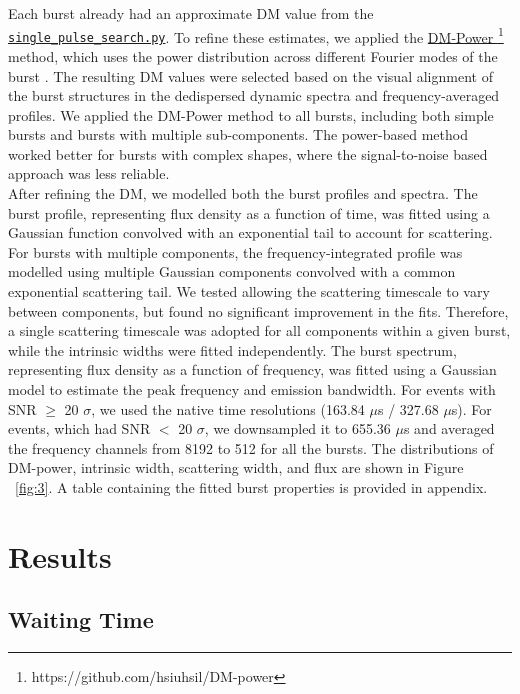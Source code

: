\documentclass[preprint2, trackchanges]{aastex631}
\begin{document}
Each burst already had an approximate DM value from the  \href{https://github.com/scottransom/presto/blob/master/bin/single_pulse_search.py}{\texttt{single\_pulse\_search.py}}. To refine these estimates, we applied the \href{https://github.com/hsiuhsil/DM-power}{DM-Power \footnote{\url{https://github.com/hsiuhsil/DM-power}}} method, which uses the power distribution across different Fourier modes of the burst \citep{2022arXiv220813677L}.  The resulting DM values were selected based on the visual alignment of the burst structures in the dedispersed dynamic spectra and frequency-averaged profiles. We applied the DM-Power method to all bursts, including both simple bursts and bursts with multiple sub-components. The power-based method worked better for bursts with complex shapes, where the signal-to-noise  based approach was less reliable.
\\
After refining the DM, we modelled both the burst profiles and spectra. The burst profile, representing flux density as a function of time, was fitted using a Gaussian function convolved with an exponential tail to account for scattering. For bursts with multiple components, the frequency-integrated profile was modelled using multiple Gaussian components convolved with a common exponential scattering tail. We tested allowing the scattering timescale to vary between components, but found no significant improvement in the fits. Therefore, a single scattering timescale was adopted for all components within a given burst, while the intrinsic widths were fitted independently. The burst spectrum, representing flux density as a function of frequency, was fitted using a Gaussian model to estimate the peak frequency and emission bandwidth. For events with SNR $\geq$ 20 $\sigma$, we used the native time resolutions (163.84 $\mu$s / 327.68 $\mu$s). For events, which had SNR $<$ 20 $\sigma$, we downsampled it to 655.36 $\mu$s and averaged the frequency channels from 8192 to 512 for all the bursts. The distributions of DM-power, intrinsic width, scattering width, and flux are shown in Figure ~\ref{fig:3}. A table containing the fitted burst properties is provided in appendix.
\section{Results}

\subsection{Waiting Time}
\end{document}
